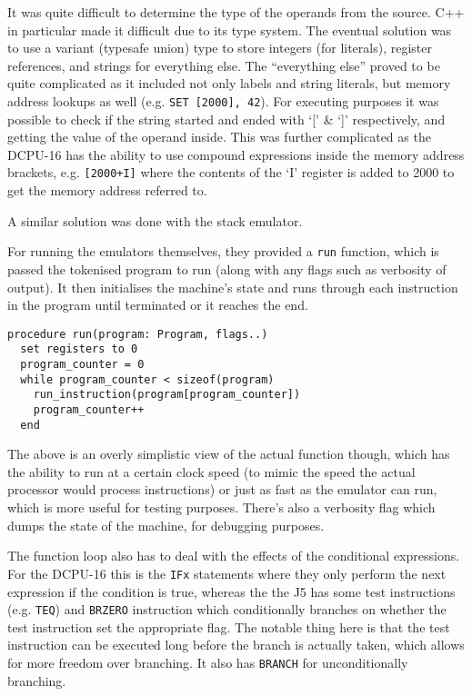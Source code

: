 It was quite difficult to determine the type of the operands from the source.
C++ in particular made it difficult due to its type system. The eventual
solution was to use a variant (typesafe union) type to store integers (for
literals), register references, and strings for everything else. The
``everything else'' proved to be quite complicated as it included not only
labels and string literals, but memory address lookups as well (e.g.
\lstinline{SET [2000], 42}). For executing purposes it was possible to check if
the string started and ended with `[' \& `]' respectively, and getting the value
of the operand inside. This was further complicated as the DCPU-16 has the
ability to use compound expressions inside the memory address brackets, e.g.
\lstinline{[2000+I]} where the contents of the `I' register is added to 2000 to
get the memory address referred to.

A similar solution was done with the stack
emulator.

For running the emulators themselves, they provided a \lstinline{run} function,
which is passed the tokenised program to run (along with any flags such as
verbosity of output). It then initialises the machine's state and runs through
each instruction in the program until terminated or it reaches the end.

\begin{lstlisting}[caption={Running a DCPU-16 program}]
procedure run(program: Program, flags..)
  set registers to 0
  program_counter = 0
  while program_counter < sizeof(program)
    run_instruction(program[program_counter])
    program_counter++
  end
\end{lstlisting}

The above is an overly simplistic view of the actual function though, which has
the ability to run at a certain clock speed (to mimic the speed the actual
processor would process instructions) or just as fast as the emulator can run,
which is more useful for testing purposes. There's also a verbosity flag which
dumps the state of the machine, for debugging purposes.

The function loop also has to deal with the effects of the conditional
expressions. For the DCPU-16 this is the \lstinline{IFx} statements where they
only perform the next expression if the condition is true, whereas the the J5
has some test instructions (e.g. \lstinline{TEQ}) and \lstinline{BRZERO}
instruction which conditionally branches on whether the test instruction set the
appropriate flag. The notable thing here is that the test instruction can be
executed long before the branch is actually taken, which allows for more freedom
over branching. It also has \lstinline{BRANCH} for unconditionally branching.

